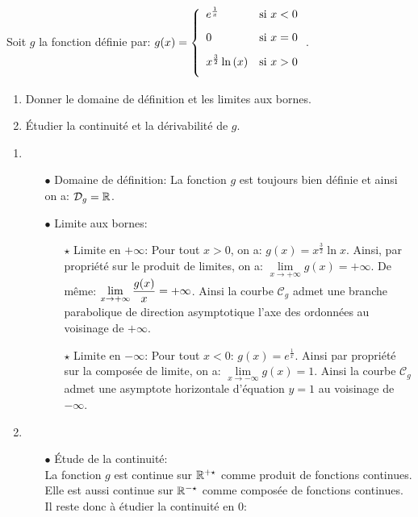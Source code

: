 \documentclass[a4paper, 11pt,reqno]{article}
\begin{document}
\begin{exercice}  \;
	Soit $g$ la fonction d\'efinie par: $g(x)=\left\lbrace \begin{array}{ll} e^{\frac{1}{x}} &\hbox{si}\ x<0\vsec\\ 0 &\hbox{si}\ x=0\vsec\\  x^{\frac{3}{2}}\ln{(x)}&\hbox{si}\ x>0\vsec \end{array}\right.$.
	\begin{enumerate}
		\item Donner le domaine de d\'efinition et les limites aux bornes.
		\item \'Etudier la continuit\'e et la d\'erivabilit\'e de $g$.
	\end{enumerate}
\end{exercice}
\begin{correction}  \;
	\begin{enumerate}
		\item
		      \begin{itemize}
			      \item[$\bullet$] Domaine de d\'efinition: La fonction $g$ est toujours bien d\'efinie et ainsi on a: $\mathcal{D}_g=\mathbb{R}$.
			      \item[$\bullet$] Limite aux bornes:
			            \begin{itemize}
				            \item[$\star$] Limite en $+\infty$: Pour tout $x>0$, on a: $g(x)=x^{\frac{3}{2}}\ln{x}$. Ainsi, par propri\'et\'e sur le produit de limites, on a: $\lim\limits_{x\to +\infty} g(x)=+\infty$. De m\^{e}me: $\lim\limits_{x\to +\infty} \displaystyle\frac{g(x)}{x}=+\infty$. Ainsi la courbe $\mathcal{C}_g$ admet une branche parabolique de direction asymptotique l'axe des ordonn\'ees au voisinage de $+\infty$.
				            \item[$\star$] Limite en $-\infty$: Pour tout $x<0$: $g(x)=e^{\frac{1}{x}}$. Ainsi par propri\'et\'e sur la compos\'ee de limite, on a: $\lim\limits_{x\to -\infty} g(x)=1$. Ainsi la courbe $\mathcal{C}_g$ admet une asymptote horizontale d'\'equation $y=1$ au voisinage de $-\infty$.
			            \end{itemize}
		      \end{itemize}
		\item
		      \begin{itemize}
			      \item[$\bullet$] \'Etude de la continuit\'e:\\
			            \noindent La fonction $g$ est continue sur $\mathbb{R}^{+\star}$ comme produit de fonctions continues. Elle est aussi continue sur $\mathbb{R}^{-\star}$ comme compos\'ee de fonctions continues. Il reste donc \`{a} \'etudier la continuit\'e en 0: \\

\end{itemize}
\end{enumerate}
\end{correction}
\end{document}
